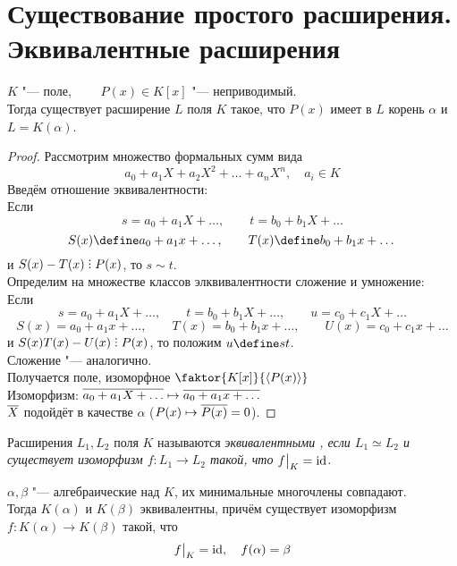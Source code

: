 \section{Существование простого расширения. Эквивалентные расширения}

\begin{theorem}
	$ K $ "--- поле, $ \qquad P(x) \in K[x] $ "--- неприводимый. \\
	Тогда существует расширение $ L $ поля $ K $ такое, что $ P(x) $ имеет в $ L $ корень $ \alpha $ и $ L = K(\alpha) $.
\end{theorem}

\begin{proof}
	Рассмотрим множество формальных сумм вида
	$$ a_0 + a_1X + a_2X^2 + \dots + a_nX^n, \quad a_i \in K $$
	Введём отношение эквивалентности: \\
	Если
	$$ s = a_0 + a_1X + \dots, \qquad t = b_0 + b_1X + \dots $$
	$$ S(x) \define a_0 + a_1x + \dots, \qquad T(x) \define b_0 + b_1x + \dots $$
	и $ S(x) - T(x) \divby P(x) $, то $ s \sim t $. \\
	Определим на множестве классов элквивалентности сложение и умножение: \\
	Если
	$$ s = a_0 + a_1X + \dots, \qquad t = b_0 + b_1X + \dots, \qquad u = c_0 + c_1X + \dots $$
	$$ S(x) = a_0 + a_1x + \dots, \qquad T(x) = b_0 + b_1x + \dots, \qquad U(x) = c_0 + c_1x + \dots $$
	и $ S(x)T(x) - U(x) \divby P(x) $, то положим $ u \define st $. \\
	Сложение "--- аналогично. \\
	Получается поле, изоморфное $ \faktor{K[x]}{\braket{P(x)}} $ \\
	Изоморфизм: $ \overline{a_0 + a_1X + \dots} \mapsto \overline{a_0 + a_1x + \dots} $ \\
	$ \overline X $ подойдёт в качестве $ \alpha $ (\as $ P(x) \mapsto \overline{P(x)} = 0 $).
\end{proof}

\begin{definition}
	Расширения $ L_1, L_2 $ поля $ K $ называются \it{эквивалентными} \nimp[(относительно $ K $)], если $ L_1 \simeq L_2 $ и существует изоморфизм $ f : L_1 \to L_2 $ такой, что $ f\big|_{K}^{} = \operatorname{id} $.
\end{definition}

\begin{theorem}
	$ \alpha, \beta $ "--- алгебраические над $ K $, их минимальные многочлены совпадают. \\
	Тогда $ K(\alpha) $ и $ K(\beta) $ эквивалентны, причём существует изоморфизм $ f : K(\alpha) \to K(\beta) $ такой, что
	$$ f\big|_{K}^{} = \operatorname{id}, \quad f(\alpha) = \beta $$
\end{theorem}

